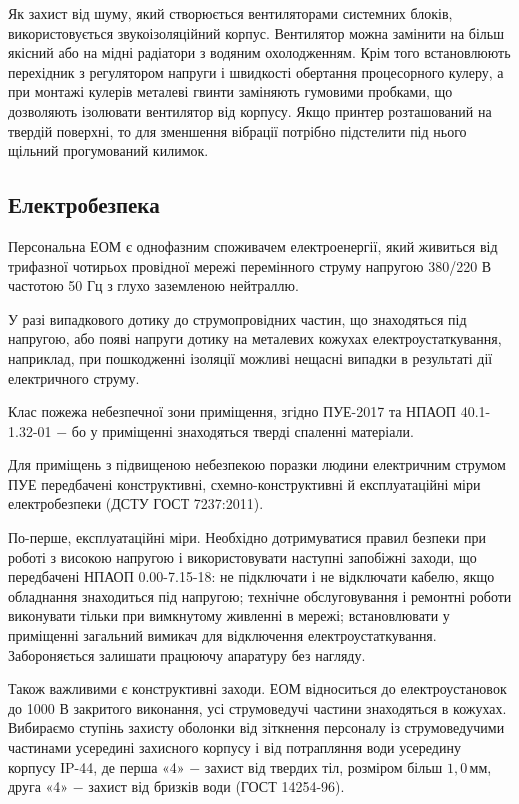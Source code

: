 Як захист від шуму, який створюється вентиляторами системних блоків, використовується звукоізоляційний корпус. Вентилятор можна замінити на більш якісний або на мідні радіатори з водяним охолодженням. Крім того встановлюють перехідник з регулятором напруги і швидкості обертання процесорного кулеру, а при монтажі кулерів металеві гвинти заміняють гумовими пробками, що дозволяють ізолювати вентилятор від корпусу. Якщо принтер розташований на твердій поверхні, то для зменшення вібрації потрібно підстелити під нього щільний прогумований килимок.

\subsection{Електробезпека}

Персональна ЕОМ є однофазним споживачем електроенергії, який живиться від трифазної чотирьох провідної мережі перемінного струму напругою 380/220 В частотою 50 Гц з глухо заземленою нейтраллю.

У разі випадкового дотику до струмопровідних частин, що знаходяться під напругою, або появі напруги дотику на металевих кожухах електроустаткування, наприклад, при пошкодженні ізоляції можливі нещасні випадки в результаті дії електричного струму.

Клас пожежа небезпечної зони приміщення, згідно ПУЕ-2017 та НПАОП 40.1-1.32-01 $-$ бо у приміщенні знаходяться тверді спаленні матеріали. 

Для приміщень з підвищеною небезпекою поразки людини електричним струмом ПУЕ передбачені конструктивні, схемно-конструктивні й експлуатаційні міри електробезпеки (ДСТУ ГОСТ 7237:2011).

	По-перше, експлуатаційні міри. Необхідно дотримуватися правил безпеки при роботі з високою напругою і використовувати наступні запобіжні заходи, що передбачені НПАОП 0.00-7.15-18: не підключати і не відключати кабелю, якщо обладнання знаходиться під напругою; технічне обслуговування і ремонтні роботи виконувати тільки при вимкнутому живленні в мережі; встановлювати у приміщенні загальний вимикач для відключення електроустаткування. Забороняється залишати працюючу апаратуру без нагляду.

	Також важливими є конструктивні заходи. ЕОМ відноситься до електроустановок до 1000 В закритого виконання, усі струмоведучі частини знаходяться в кожухах. Вибираємо ступінь захисту оболонки від зіткнення персоналу із струмоведучими частинами усередині захисного корпусу і від потрапляння води усередину корпусу ІP-44, де перша «4» $-$ захист від твердих тіл, розміром більш $1,0 \, \text{мм}$, друга «4» $-$ захист від бризків води (ГОСТ 14254-96).

